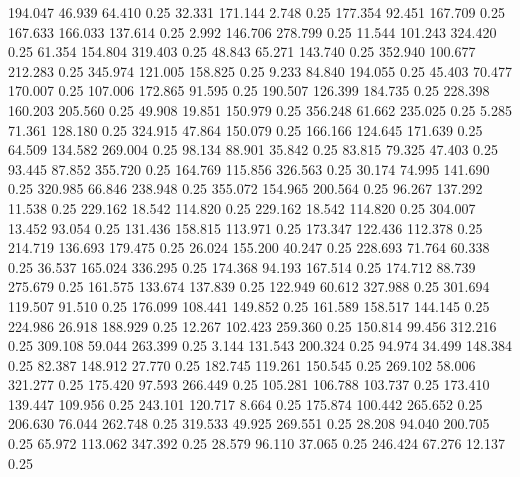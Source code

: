  194.047   46.939   64.410         0.25
  32.331  171.144    2.748         0.25
 177.354   92.451  167.709         0.25
 167.633  166.033  137.614         0.25
   2.992  146.706  278.799         0.25
  11.544  101.243  324.420         0.25
  61.354  154.804  319.403         0.25
  48.843   65.271  143.740         0.25
 352.940  100.677  212.283         0.25
 345.974  121.005  158.825         0.25
   9.233   84.840  194.055         0.25
  45.403   70.477  170.007         0.25
 107.006  172.865   91.595         0.25
 190.507  126.399  184.735         0.25
 228.398  160.203  205.560         0.25
  49.908   19.851  150.979         0.25
 356.248   61.662  235.025         0.25
   5.285   71.361  128.180         0.25
 324.915   47.864  150.079         0.25
 166.166  124.645  171.639         0.25
  64.509  134.582  269.004         0.25
  98.134   88.901   35.842         0.25
  83.815   79.325   47.403         0.25
  93.445   87.852  355.720         0.25
 164.769  115.856  326.563         0.25
  30.174   74.995  141.690         0.25
 320.985   66.846  238.948         0.25
 355.072  154.965  200.564         0.25
  96.267  137.292   11.538         0.25
 229.162   18.542  114.820         0.25
 229.162   18.542  114.820         0.25
 304.007   13.452   93.054         0.25
 131.436  158.815  113.971         0.25
 173.347  122.436  112.378         0.25
 214.719  136.693  179.475         0.25
  26.024  155.200   40.247         0.25
 228.693   71.764   60.338         0.25
  36.537  165.024  336.295         0.25
 174.368   94.193  167.514         0.25
 174.712   88.739  275.679         0.25
 161.575  133.674  137.839         0.25
 122.949   60.612  327.988         0.25
 301.694  119.507   91.510         0.25
 176.099  108.441  149.852         0.25
 161.589  158.517  144.145         0.25
 224.986   26.918  188.929         0.25
  12.267  102.423  259.360         0.25
 150.814   99.456  312.216         0.25
 309.108   59.044  263.399         0.25
   3.144  131.543  200.324         0.25
  94.974   34.499  148.384         0.25
  82.387  148.912   27.770         0.25
 182.745  119.261  150.545         0.25
 269.102   58.006  321.277         0.25
 175.420   97.593  266.449         0.25
 105.281  106.788  103.737         0.25
 173.410  139.447  109.956         0.25
 243.101  120.717    8.664         0.25
 175.874  100.442  265.652         0.25
 206.630   76.044  262.748         0.25
 319.533   49.925  269.551         0.25
  28.208   94.040  200.705         0.25
  65.972  113.062  347.392         0.25
  28.579   96.110   37.065         0.25
 246.424   67.276   12.137         0.25
